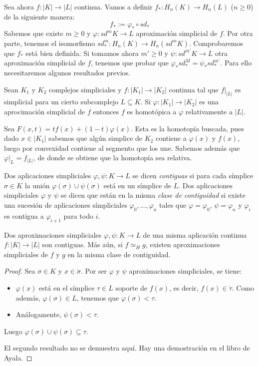 \documentclass[HS.tex]{subfiles}
\begin{document}
Sea ahora $f:|K|\to|L|$ continua. Vamos a definir $f_*:H_n(K)\to H_n(L)$ ($n\geq 0$) de la siguiente manera:
\[
f_*:=\varphi_*\circ sd_*
\]
Sabemos que existe $m\geq 0$ y $\varphi:sd^mK\to L$ aproximación simplicial de $f$. Por otra parte, tenemos el isomorfismo $sd_*^m:H_n(K)\to H_n(sd^mK)$. Comprobaremos que $f_*$ está bien definida. Si tomamos ahora $m'\geq 0$ y $\psi:sd^{m'}K\to L$ otra aproximación simplicial de $f$, tenemos que probar que $\varphi_*sd_*^M=\psi_*sd_*^{m'}$. Para ello necesitaremos algunos resultados previos.

\begin{prop}
Sean $K_1$ y $K_2$ complejos simpliciales y $f:|K_1|\to|K_2|$ continua tal que $f|_{|L|}$ es simplicial para un cierto subcomplejo $L\subseteq K$. Si $\varphi:|K_1|\to|K_2|$ es una aprocimación simplicial de $f$ entonces $f$ es homotópica a $\varphi$ relativamente a $|L|$.  
\end{prop}
\begin{dem}
Sea $F(x,t)=tf(x)+(1-t)\varphi(x)$. Esta es la homotopía buscada, pues dado $x\in|K_1|$ sabemos que algún simplice de $K_2$ contiene a $\varphi(x)$ y $f(x)$, luego por convexidad contiene al segmento que los une. Sabemos además que $\varphi|_{L}=f_{|L|}$, de donde se obtiene que la homotopía sea relativa.
\QED
\end{dem}

\begin{defi}
Dos aplicaciones simpliciales $\varphi,\psi:K\to L$ se dicen \emph{contiguas} si para cada símplice $\sigma\in K$ la unión $\varphi(\sigma)\cup\psi(\sigma)$ está en un símplice de $L$. Dos aplicaciones simpliciales $\varphi$ y $\psi$ se dicen que están en la misma \emph{clase de contiguidad} si existe una sucesión de aplicaciones símpliciales $\varphi_0,\dots, \varphi_n$ tales que $\varphi=\varphi_0$, $\psi=\varphi_n$ y $\varphi_i$ es contigua a $\varphi_{i+1}$ para todo $i$. 
\end{defi}

\begin{lemma}
Dos aproximaciones simpliciales $\varphi,\psi:K\to L$ de una misma aplicación continua $f:|K|\to|L|$ son contiguas. Más aún, si $f\simeq_H g$, existen aproximaciones simpliciales de $f$ y $g$ en la misma clase de contiguidad.
\end{lemma}
\begin{proof}
Sea $\sigma \in K$ y $x \in \mathring{\sigma}$.
Por ser $\varphi$ y $\psi$ aproximaciones simpliciales, se tiene:
\begin{itemize}
	\item $\varphi(x)$ está en el símplice $\tau \in L$ soporte de $f(x)$, es decir, $f(x) \in \mathring{\tau}$.
	Como además, $\varphi(\sigma) \in L$, tenemos que $\varphi(\sigma) < \tau$.
	\item Análogamente, $\psi(\sigma) < \tau$.
\end{itemize}
Luego $\varphi(\sigma) \cup \psi(\sigma) \subseteq \tau$.

El segundo resultado no se demuestra aquí.
Hay una demostración en el libro de Ayala.
\end{proof}
\end{document}

